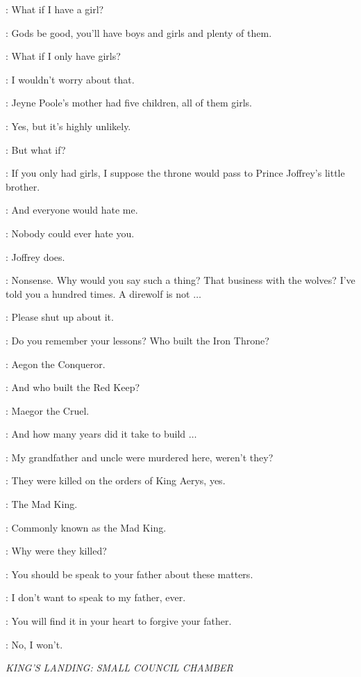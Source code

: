 \SANSA: What if I have a girl? 

\SEPTAMORDANE: Gods be good, you'll have boys and girls and plenty of them. 

\SANSA: What if I only have girls? 

\SEPTAMORDANE: I wouldn't worry about that. 

\SANSA: Jeyne Poole's mother had five children, all of them girls. 

\SEPTAMORDANE: Yes, but it's highly unlikely. 

\SANSA: But what if? 

\SEPTAMORDANE: If you only had girls, I suppose the throne would pass to Prince Joffrey's little brother. 

\SANSA: And everyone would hate me. 

\SEPTAMORDANE: Nobody could ever hate you. 

\SANSA: Joffrey does. 

\SEPTAMORDANE: Nonsense. Why would you say such a thing? That business with the wolves? I've told you a hundred times. A direwolf is not $\ldots$ 

\SANSA: Please shut up about it. 

\SEPTAMORDANE: Do you remember your lessons? Who built the Iron Throne? 

\SANSA: Aegon the Conqueror. 

\SEPTAMORDANE: And who built the Red Keep? 

\SANSA: Maegor the Cruel. 

\SEPTAMORDANE: And how many years did it take to build $\ldots$ 

\SANSA: My grandfather and uncle were murdered here, weren't they? 

\SEPTAMORDANE: They were killed on the orders of King Aerys, yes. 

\SANSA: The Mad King. 

\SEPTAMORDANE: Commonly known as the Mad King. 

\SANSA: Why were they killed? 

\SEPTAMORDANE: You should be speak to your father about these matters. 

\SANSA: I don't want to speak to my father, ever. 

\SEPTAMORDANE: You will find it in your heart to forgive your father. 

\SANSA: No, I won't. 

\scene

\textit{KING'S LANDING: SMALL COUNCIL CHAMBER}

